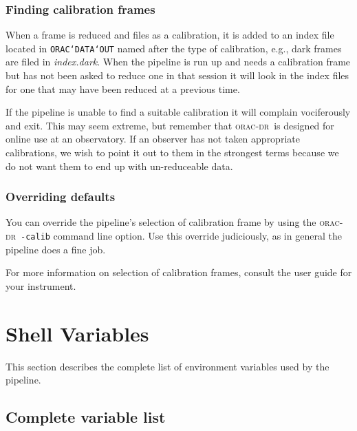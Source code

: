 \documentclass[twoside,11pt]{article}
\newcommand{\xlabel}[1]{}
\renewcommand{\_}{\texttt{\symbol{95}}}
\def\C++{{\rm C\kern-.05em\raise.3ex\hbox{\footnotesize ++}}}
\newcommand{\underscore}{\_}
\newcommand{\oracdr}{\textsc{orac-dr}}
\begin{document}
\subsubsection*{Finding calibration frames}

When a frame is reduced and files as a calibration, it is added to an
index file located in {\tt ORAC\char`\_DATA\char`\_OUT} named after the type of
calibration, e.g., dark frames are filed in {\em index.dark\/}. When the
pipeline is run up and needs a calibration frame but has not been
asked to reduce one in that session it will look in the index files
for one that may have been reduced at a previous time. 

If the pipeline is unable to find a suitable calibration it will
complain vociferously and exit. This may seem extreme, but remember
that \oracdr\ is designed for online use at an observatory. If an
observer has not taken appropriate calibrations, we wish to point
it out to them in the strongest terms because we do not want them
to end up with un-reduceable data.

\subsubsection*{Overriding defaults}

You can override the pipeline's selection of calibration frame by
using the \oracdr\ {\tt -calib} command line option. Use this override
judiciously, as in general the pipeline does a fine job.

For more information on selection of calibration frames, consult the
user guide for your instrument.



\section{Shell Variables\xlabel{shell_variables}}

This section describes the complete list of environment variables
used by the pipeline.

\subsection*{Complete variable list}
\end{document}
